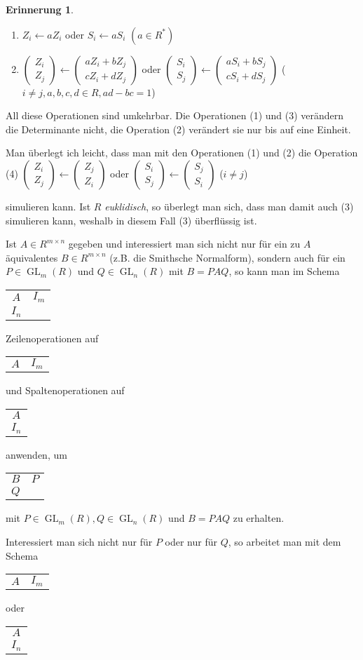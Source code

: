\documentclass[
twoside=semi,
fontsize=12,
DIV=12, 
cleardoublepage=current,
leqno,
headings=optiontoheadandtoc, 
toc=idx
]{scrbook}
\newcommand{\Z}{\mathbb{Z}}
\newcommand{\schemaSmith}[3]{\begin{NiceTabular}[corners={NE,SE}, hvlines]{cc} #1 & #2 \\ #3 \end{NiceTabular}}
\newcommand{\schemaSmithH}[2]{\begin{NiceTabular}[corners={NE,SE}, hvlines]{cc} #1 & #2 \end{NiceTabular}}
\newcommand{\schemaSmithV}[2]{\begin{NiceTabular}[corners={NE,SE}, hvlines]{c} #1 \\ #2 \end{NiceTabular}}
\DeclareMathOperator{\GL}{GL}
\theoremstyle{definition}
\newtheorem{erinnerung}[definition]{Erinnerung}
\begin{document}
\begin{erinnerung}
\begin{enumerate}[(1)]
				\item $Z_i \gets aZ_i$ oder $S_i \gets aS_i$ \hfill $(a \in R^*)$
				
				\item $\begin{pmatrix}  Z_i\\Z_j \end{pmatrix} \gets \begin{pmatrix} aZ_i + bZ_j\\cZ_i + dZ_j \end{pmatrix}$ oder 
					$\begin{pmatrix} S_i\\S_j \end{pmatrix} \gets \begin{pmatrix} aS_i + bS_j\\cS_i + dS_j \end{pmatrix}$ 
				\hfill ($i\neq j, a, b, c, d \in R, ad -bc = 1$)
			\end{enumerate}
		All diese Operationen sind umkehrbar. Die Operationen (1) und (3) ver\"andern die Determinante nicht, die Operation (2) ver\"andert sie nur bis auf eine Einheit. 
		
		Man \"uberlegt ich leicht, dass man mit den Operationen (1) und (2) die Operation (4)\newline
		$\begin{pmatrix} Z_i\\Z_j \end{pmatrix} \gets \begin{pmatrix} Z_j\\Z_i \end{pmatrix}$ oder 
		$\begin{pmatrix} S_i\\S_j \end{pmatrix}\gets \begin{pmatrix} S_j\\S_i \end{pmatrix}$ 
		\hfill ($i\neq j$)\newline

	simulieren kann. Ist $R$ \emph{euklidisch}, so \"uberlegt man sich, dass man damit auch (3) simulieren kann, weshalb in diesem Fall (3) \"uberfl\"ussig ist.
	
	Ist $A \in R^{m\times n}$ gegeben und interessiert man sich nicht nur f\"ur ein zu $A$ \"aquivalentes $B \in R^{m\times n}$ (z.B. die Smithsche Normalform), sondern auch f\"ur ein $P \in \GL_m(R)$ und $Q \in \GL_n(R)$ mit $B = PAQ$, so kann man im Schema \schemaSmith{$A$}{$I_m$}{$I_n$} Zeilenoperationen auf \schemaSmithH{$A$}{$I_m$} und Spaltenoperationen auf \schemaSmithV{$A$}{$I_n$} anwenden, um \schemaSmith{$B$}{$P$}{$Q$} mit $P \in \GL_m(R), Q \in \GL_n(R)$ und $B=PAQ$ zu erhalten.
	
	Interessiert man sich nicht nur f\"ur $P$ oder nur f\"ur $Q$, so arbeitet man mit dem Schema \schemaSmithH{$A$}{$I_m$} oder \schemaSmithV{$A$}{$I_n$}

 	\end{erinnerung}
 
\end{document}
